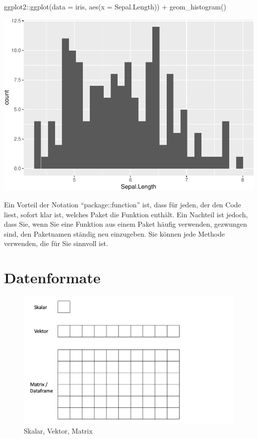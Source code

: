 \documentclass[
]{book}
\newenvironment{Shaded}{\begin{snugshade}}{\end{snugshade}}
\newcommand{\AttributeTok}[1]{\textcolor[rgb]{0.77,0.63,0.00}{#1}}
\newcommand{\FunctionTok}[1]{\textcolor[rgb]{0.00,0.00,0.00}{#1}}
\newcommand{\NormalTok}[1]{#1}
\newcommand{\SpecialCharTok}[1]{\textcolor[rgb]{0.00,0.00,0.00}{#1}}
\begin{document}
\begin{Shaded}
\begin{Highlighting}[]
\NormalTok{ggplot2}\SpecialCharTok{::}\FunctionTok{ggplot}\NormalTok{(}\AttributeTok{data =}\NormalTok{ iris, }\FunctionTok{aes}\NormalTok{(}\AttributeTok{x =}\NormalTok{ Sepal.Length)) }\SpecialCharTok{+} 
  \FunctionTok{geom\_histogram}\NormalTok{()}
\end{Highlighting}
\end{Shaded}

\includegraphics{CFH_R_bookdown_files/figure-latex/unnamed-chunk-11-1.pdf}

Ein Vorteil der Notation ``package::function'' ist, dass für jeden, der den Code liest, sofort klar ist, welches Paket die Funktion enthält. Ein Nachteil ist jedoch, dass Sie, wenn Sie eine Funktion aus einem Paket häufig verwenden, gezwungen sind, den Paketnamen ständig neu einzugeben. Sie können jede Methode verwenden, die für Sie sinnvoll ist.

\hypertarget{datenformate}{%
\chapter{Datenformate}\label{datenformate}}

\begin{figure}
\includegraphics[width=20.54in]{images/Datenformat_1} \caption{Skalar, Vektor, Matrix}\label{fig:unnamed-chunk-12}
\end{figure}
\end{document}
